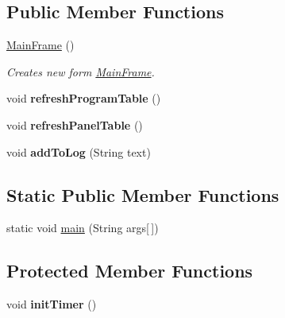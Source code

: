 \subsection*{Public Member Functions}
\begin{DoxyCompactItemize}
\item 
\hypertarget{classgui_1_1MainFrame_aaeeb6a0f50e5e5bddfa7f05d3871e9ec}{\hyperlink{classgui_1_1MainFrame_aaeeb6a0f50e5e5bddfa7f05d3871e9ec}{Main\-Frame} ()}\label{classgui_1_1MainFrame_aaeeb6a0f50e5e5bddfa7f05d3871e9ec}

\begin{DoxyCompactList}\small\item\em Creates new form \hyperlink{classgui_1_1MainFrame}{Main\-Frame}. \end{DoxyCompactList}\item 
\hypertarget{classgui_1_1MainFrame_a80f02b2b3a38e33da6a5cf95cf90dfa7}{void {\bfseries refresh\-Program\-Table} ()}\label{classgui_1_1MainFrame_a80f02b2b3a38e33da6a5cf95cf90dfa7}

\item 
\hypertarget{classgui_1_1MainFrame_aa191c6f403de836ce1818821026a6a1f}{void {\bfseries refresh\-Panel\-Table} ()}\label{classgui_1_1MainFrame_aa191c6f403de836ce1818821026a6a1f}

\item 
\hypertarget{classgui_1_1MainFrame_a3ff1c92e306a00fe2362a27f0e38d0ed}{void {\bfseries add\-To\-Log} (String text)}\label{classgui_1_1MainFrame_a3ff1c92e306a00fe2362a27f0e38d0ed}

\end{DoxyCompactItemize}
\subsection*{Static Public Member Functions}
\begin{DoxyCompactItemize}
\item 
static void \hyperlink{classgui_1_1MainFrame_a9426bc550d35eaa70ea8c78ff18dae56}{main} (String args\mbox{[}$\,$\mbox{]})
\end{DoxyCompactItemize}
\subsection*{Protected Member Functions}
\begin{DoxyCompactItemize}
\item 
\hypertarget{classgui_1_1MainFrame_a02cdeab719249c5c7de74f74d1eabf2b}{void {\bfseries init\-Timer} ()}\label{classgui_1_1MainFrame_a02cdeab719249c5c7de74f74d1eabf2b}

\end{DoxyCompactItemize}


